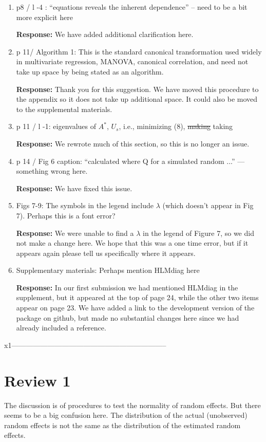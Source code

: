 \documentclass[11pt]{article}
\begin{document}
\begin{enumerate}
\item p8 / l -4 : ``equations reveals the inherent dependence'' -- need to be a bit more explicit here

\textbf{Response:} We have added additional clarification here.

\item p 11/ Algorithm 1: This is the standard canonical transformation used widely in multivariate regression, MANOVA, canonical correlation, and need not take up space by being stated as an algorithm.

\textbf{Response:} Thank you for this suggestion. We have moved this procedure to the appendix so it does not take up additional space. It could also be moved to the supplemental materials.

\item p 11 / l -1: eigenvalues of $A^*$, $U_s$, i.e., minimizing (8), \sout{making} taking

\textbf{Response:} We rewrote much of this section, so this is no longer an issue.

\item p 14 / Fig 6 caption: ``calculated where Q for a simulated random ...'' --- something wrong
here.

\textbf{Response:} We have fixed this issue.

\item Figs 7-9: The symbols in the legend include $\lambda$ (which doesn't appear in Fig 7). Perhaps this is a font error?

\textbf{Response:} We were unable to find a $\lambda$ in the legend of Figure 7,  so we did not make a change here. We hope that this was a one time error, but if it appears again please tell us specifically where it appears.

\item Supplementary materials: Perhaps mention HLMdiag here

\textbf{Response:} In our first submission we had mentioned HLMdiag in the supplement, but it appeared at the top of page 24, while the other two items appear on page 23. We have added a link to the development version of the package on github, but made no substantial changes here since we had already included a reference.

\end{enumerate}

x1-----------------------------------------------------------------
\section*{Review 1}
The discussion is of procedures to test the normality of random effects.  But there seems to be a big confusion here.  The distribution of the actual (unobserved) random effects is not the same as the distribution of the estimated random effects.
\end{document}
